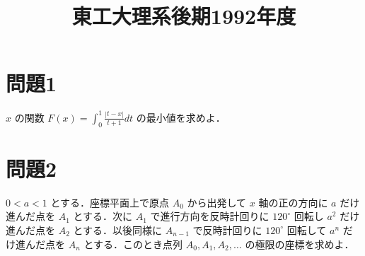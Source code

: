 \documentclass[unicode,12pt, a4paper]{ltjsarticle}%
\title{東工大理系後期1992年度}
\begin{document}
\maketitle
\section{問題1}
$x$ の関数 $\displaystyle F(x) = \int_0^1 \frac{|t-x|}{t+1} dt$ の最小値を求めよ．

\section{問題2}
$0 < a < 1$ とする．座標平面上で原点 $A_0$ から出発して $x$ 軸の正の方向に $a$ だけ進んだ点を $A_1$ とする．次に $A_1$ で進行方向を反時計回りに $120^\circ$ 回転し $a^2$ だけ進んだ点を $A_2$ とする．以後同様に $A_{n-1}$ で反時計回りに $120^\circ$ 回転して $a^n$ だけ進んだ点を $A_n$ とする．このとき点列 $A_0, A_1, A_2, \dots$ の極限の座標を求めよ．
\end{document}
